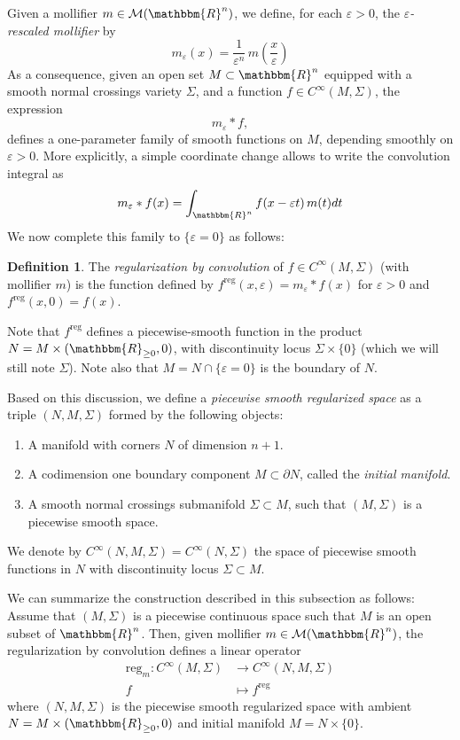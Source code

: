 \documentclass[11pt,psamsfonts]{article}
\newcommand{\tmem}[1]{{\em #1\/}}
\newenvironment{enumeratenumeric}{\begin{enumerate}[1.] }{\end{enumerate}}
\theoremstyle{definition}
\newtheorem{Definition}[Theorem]{Definition}
\theoremstyle{remark}
\newcommand{\cR}{\ensuremath{\mathbbm{R}}}
\newcommand{\eps}{\varepsilon }
\newcommand{\Mol}{\mathcal{M}}
\newcommand{\vf}{f}
\newcommand{\rg}{\mathrm{reg}}
\newcommand{\reg}{\mathrm{reg}}
\begin{document}
Given a mollifier $m \in \Mol(\cR^n)$, we define, for each $\eps >0$, the {\em $\eps$-rescaled mollifier} by
\begin{equation}\label{rescaled-mollifier}
m_\eps(x) = \frac{1}{\eps^n}\, m\left(\frac{x}{\eps}\right)
\end{equation}
As a consequence, given an open set $M \subset \cR^n$ equipped with a smooth normal crossings variety $\Sigma$, and a function $\vf\in C^\infty(M,\Sigma)$, the expression
$$
m_\eps \ast \vf,
$$
defines a one-parameter family of smooth functions on $M$, depending smoothly on $\eps > 0$. More explicitly, a simple coordinate change allows to write the convolution integral as
\begin{equation}\label{expr-f_k}
m_\eps \ast \vf(x)= \int_{\cR^n} f (x - \eps t)\, m (t) d t
\end{equation}
We now complete this family to $\{\eps = 0\}$ as follows:
\begin{Definition}\label{def-regfconv}
The {\em regularization by convolution }of $\vf \in C^\infty(M,\Sigma)$ (with mollifier $m$) is the function defined by
$\vf^{\rg}(x,\eps) = m_\eps \ast \vf(x)$ for $\eps >0$ and $\vf^\rg(x,0) = \vf(x)$.
\end{Definition}

Note that $\vf^\rg$ defines a piecewise-smooth function in the product $N = M \times (\cR_{\ge 0},0)$, with discontinuity locus $\Sigma \times \{0\}$ (which we will still note $\Sigma$). Note also that $M=N \cap \{\eps = 0\}$ is the boundary of $N$. 

Based on this discussion, we define a {\tmem{piecewise smooth regularized space}}  as a triple $(N, M, \Sigma)$
formed by the following objects:
\begin{enumeratenumeric}
  \item A manifold with corners $N$ of dimension $n + 1$.
  \item A codimension one boundary component $M \subset \partial N$, called
  the {\tmem{initial manifold}}.
  \item A smooth normal crossings submanifold $\Sigma \subset M$, such that $(M,
  \Sigma)$ is a piecewise smooth space. 
\end{enumeratenumeric}
We denote by $C^\infty(N,M,\Sigma)=C^\infty(N,\Sigma)$ the space of piecewise smooth functions in $N$ with discontinuity locus $\Sigma \subset M$. 

We can summarize the construction described in this subsection as follows: Assume that $(M,\Sigma)$ is a piecewise continuous space such that $M$ is an open subset of $\cR^n$. Then, given mollifier $m\in \Mol(\cR^n)$, the regularization by convolution defines a linear operator
\begin{align*}\label{regularization-operator}
\reg_m \colon C^\infty(M,\Sigma) &\longrightarrow C^{\infty}(N,M,\Sigma) \\
\vf &\longmapsto \vf^\rg
\end{align*}
where $(N,M,\Sigma)$ is the piecewise smooth regularized space with ambient $N=M\times (\cR_{\ge 0},0)$ and initial manifold $M=N\times\{0\}$.  
\end{document}
